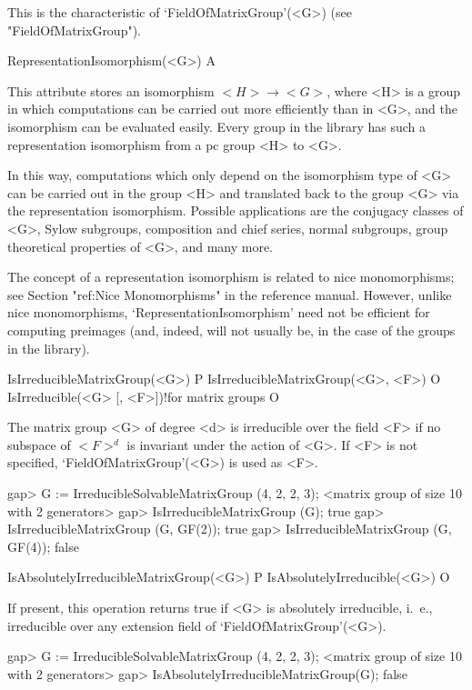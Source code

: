 This is the characteristic of `FieldOfMatrixGroup'(<G>) (see "FieldOfMatrixGroup").


\>RepresentationIsomorphism(<G>) A

This attribute stores an isomorphism $<H> \to <G>$, where <H> is a group
in which computations can be carried out more efficiently than in <G>, and 
the isomorphism can be evaluated easily. Every group in the {\IRREDSOL} library
has such a representation isomorphism from a pc group <H> to <G>.

In this way, computations which only depend on the 
isomorphism type of <G> can be carried out in the group <H> and translated
back to the group <G> via the representation isomorphism. Possible applications are the conjugacy classes of <G>, Sylow subgroups, composition and chief series, normal subgroups, group theoretical properties of <G>, and many more. 

The concept of a representation isomorphism is related to 
nice monomorphisms; see Section "ref:Nice Monomorphisms" in the {\GAP} 
reference manual. However, unlike nice monomorphisms, 
`RepresentationIsomorphism' need not be efficient for computing preimages (and, indeed, will not usually be, in the case of the groups in the {\IRREDSOL} library). 



\>IsIrreducibleMatrixGroup(<G>) P
\>IsIrreducibleMatrixGroup(<G>, <F>) O
\>IsIrreducible(<G> [, <F>])!{for matrix groups} O

The matrix group <G> of degree <d> is irreducible over the field <F> if no subspace of $<F>^d$ is
invariant under the action of <G>. If <F> is not
specified, `FieldOfMatrixGroup'(<G>) is used as <F>.

\beginexample
gap> G := IrreducibleSolvableMatrixGroup (4, 2, 2, 3);
<matrix group of size 10 with 2 generators>
gap> IsIrreducibleMatrixGroup (G);
true
gap> IsIrreducibleMatrixGroup (G, GF(2));
true
gap> IsIrreducibleMatrixGroup (G, GF(4));
false
\endexample

\>IsAbsolutelyIrreducibleMatrixGroup(<G>) P
\>IsAbsolutelyIrreducible(<G>) O

If present, this operation returns true if <G> is absolutely irreducible, i.~e., irreducible over any
extension field of `FieldOfMatrixGroup'(<G>).

\beginexample
gap> G := IrreducibleSolvableMatrixGroup (4, 2, 2, 3);
<matrix group of size 10 with 2 generators>
gap> IsAbsolutelyIrreducibleMatrixGroup(G);
false
\endexample

